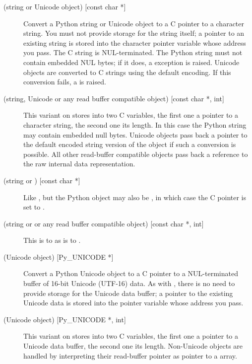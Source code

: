 \begin{description}
  \item[ (string or Unicode object) {[const char *]}]
  Convert a Python string or Unicode object to a C pointer to a
  character string.  You must not provide storage for the string
  itself; a pointer to an existing string is stored into the character
  pointer variable whose address you pass.  The C string is
  NUL-terminated.  The Python string must not contain embedded NUL
  bytes; if it does, a  exception is raised.
  Unicode objects are converted to C strings using the default
  encoding.  If this conversion fails, a  is
  raised.

  \item[ (string, Unicode or any read buffer compatible object)
  {[const char *, int]}]
  This variant on  stores into two C variables, the first one
  a pointer to a character string, the second one its length.  In this
  case the Python string may contain embedded null bytes.  Unicode
  objects pass back a pointer to the default encoded string version of
  the object if such a conversion is possible.  All other read-buffer
  compatible objects pass back a reference to the raw internal data
  representation.

  \item[ (string or ) {[const char *]}]
  Like , but the Python object may also be , in
  which case the C pointer is set to \NULL.

  \item[ (string or  or any read buffer
  compatible object) {[const char *, int]}]
  This is to  as  is to .

  \item[ (Unicode object) {[Py_UNICODE *]}]
  Convert a Python Unicode object to a C pointer to a NUL-terminated
  buffer of 16-bit Unicode (UTF-16) data.  As with , there is
  no need to provide storage for the Unicode data buffer; a pointer to
  the existing Unicode data is stored into the 
  pointer variable whose address you pass.

  \item[ (Unicode object) {[Py_UNICODE *, int]}]
  This variant on  stores into two C variables, the first one
  a pointer to a Unicode data buffer, the second one its length.
  Non-Unicode objects are handled by interpreting their read-buffer
  pointer as pointer to a  array.


\end{description}
